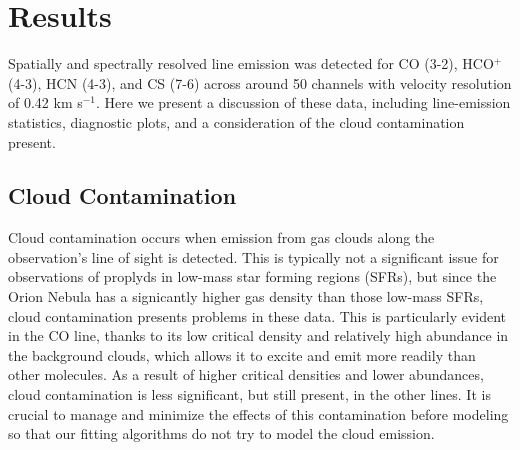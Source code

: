 \chapter{Results}
\label{chap:results}


Spatially and spectrally resolved line emission was detected for CO (3-2), HCO$^{+}$ (4-3), HCN (4-3), and CS (7-6) across around 50 channels with velocity resolution of 0.42 km s$^{-1}$. Here we present a discussion of these data, including line-emission statistics, diagnostic plots, and a consideration of the cloud contamination present.


\section{Cloud Contamination}
\label{section:cloud_contamination}

Cloud contamination occurs when emission from gas clouds along the observation's line of sight is detected. This is typically not a significant issue for observations of proplyds in low-mass star forming regions (SFRs), but since the Orion Nebula has a signicantly higher gas density than those low-mass SFRs, cloud contamination presents problems in these data. This is particularly evident in the CO line, thanks to its low critical density and relatively high abundance in the background clouds, which allows it to excite and emit more readily than other molecules. As a result of higher critical densities and lower abundances, cloud contamination is less significant, but still present, in the other lines. It is crucial to manage and minimize the effects of this contamination before modeling so that our fitting algorithms do not try to model the cloud emission.




